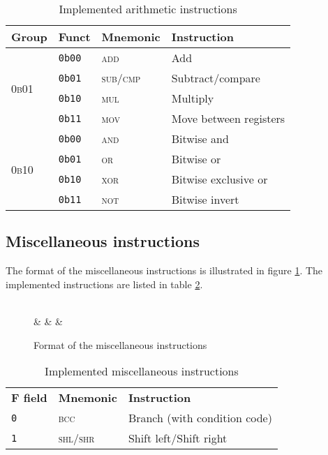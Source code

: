 \begin{table}[ht]
	\centering
	\begin{tabular}{|l l l l|}
		\hline
		\textbf{Group} & \textbf{Funct} & \textbf{Mnemonic} & \textbf{Instruction} \\
		\hline
		\multirow{4}{*}{\textsc{0b01}} & \texttt{0b00} & \textsc{add} & Add\\
		                               & \texttt{0b01} & \textsc{sub/cmp} & Subtract/compare\\
				               & \texttt{0b10} & \textsc{mul} & Multiply\\
				               & \texttt{0b11} & \textsc{mov} & Move between registers\\
		\hline
		\multirow{4}{*}{\textsc{0b10}} & \texttt{0b00} & \textsc{and} & Bitwise and\\
		                               & \texttt{0b01} & \textsc{or} & Bitwise or\\
				               & \texttt{0b10} & \textsc{xor} & Bitwise exclusive or\\
				               & \texttt{0b11} & \textsc{not} & Bitwise invert\\
		\hline
	\end{tabular}

	\label{tab:arith_instrs}
	\caption{Implemented arithmetic instructions}
\end{table}

\subsection{Miscellaneous instructions}
The format of the miscellaneous instructions is illustrated in figure \ref{fig:misc_instr_format}. The
implemented instructions are listed in table \ref{tab:misc_instrs}.

\begin{figure}[ht]
	\centering
	\begin{bytefield}[endianness=little,bitwidth=0.05\linewidth]{16}
		 \\
		 &
		 &
		 &
	\end{bytefield}

	\label{fig:misc_instr_format}
	\caption{Format of the miscellaneous instructions}
\end{figure}

\begin{table}[ht]
	\centering
	\begin{tabular}{|l l l|}
		\hline
		\textbf{F field} & \textbf{Mnemonic} & \textbf{Instruction} \\
		\texttt{0} & \textsc{bcc} & Branch (with condition code) \\
		\texttt{1} & \textsc{shl/shr} & Shift left/Shift right\\
		\hline
	\end{tabular}

	\label{tab:misc_instrs}
	\caption{Implemented miscellaneous instructions}
\end{table}

